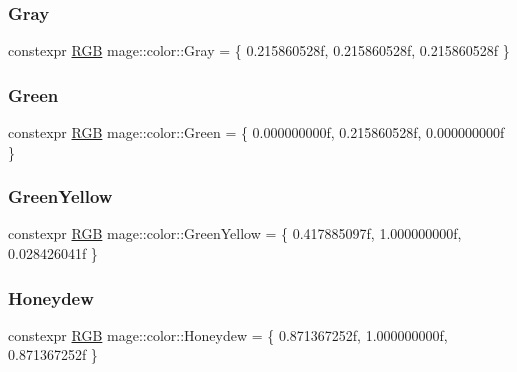 \subsubsection{\texorpdfstring{Gray}{Gray}}
{\footnotesize\ttfamily constexpr \hyperlink{structmage_1_1_r_g_b}{R\+GB} mage\+::color\+::\+Gray = \{ 0.\+215860528f, 0.\+215860528f, 0.\+215860528f \}}

\hypertarget{namespacemage_1_1color_a063b467cc0e16aa4a291c38307a21bc0}{}\label{namespacemage_1_1color_a063b467cc0e16aa4a291c38307a21bc0} 
\subsubsection{\texorpdfstring{Green}{Green}}
{\footnotesize\ttfamily constexpr \hyperlink{structmage_1_1_r_g_b}{R\+GB} mage\+::color\+::\+Green = \{ 0.\+000000000f, 0.\+215860528f, 0.\+000000000f \}}

\hypertarget{namespacemage_1_1color_a28c20da179750abce432ec6439426338}{}\label{namespacemage_1_1color_a28c20da179750abce432ec6439426338} 
\subsubsection{\texorpdfstring{Green\+Yellow}{GreenYellow}}
{\footnotesize\ttfamily constexpr \hyperlink{structmage_1_1_r_g_b}{R\+GB} mage\+::color\+::\+Green\+Yellow = \{ 0.\+417885097f, 1.\+000000000f, 0.\+028426041f \}}

\hypertarget{namespacemage_1_1color_a6fdd1089a1f0d6a77b9b6298907e3361}{}\label{namespacemage_1_1color_a6fdd1089a1f0d6a77b9b6298907e3361} 
\subsubsection{\texorpdfstring{Honeydew}{Honeydew}}
{\footnotesize\ttfamily constexpr \hyperlink{structmage_1_1_r_g_b}{R\+GB} mage\+::color\+::\+Honeydew = \{ 0.\+871367252f, 1.\+000000000f, 0.\+871367252f \}}

\hypertarget{namespacemage_1_1color_a64c422466ccc5c44c1c4a0e6f435a3c3}{}\label{namespacemage_1_1color_a64c422466ccc5c44c1c4a0e6f435a3c3} 
